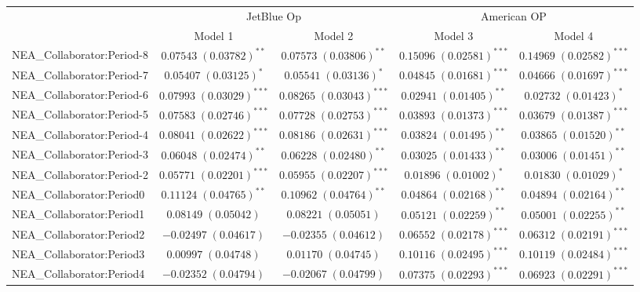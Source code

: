
\begin{tabular}{l c c c c}
\hline
 & \multicolumn{2}{c}{JetBlue Op} & \multicolumn{2}{c}{American OP} \\
\cline{2-3} \cline{4-5}
 & Model 1 & Model 2 & Model 3 & Model 4 \\
\hline
NEA\_Collaborator:Period-8 & $0.07543 \; (0.03782)^{**}$  & $0.07573 \; (0.03806)^{**}$  & $0.15096 \; (0.02581)^{***}$ & $0.14969 \; (0.02582)^{***}$ \\
NEA\_Collaborator:Period-7 & $0.05407 \; (0.03125)^{*}$   & $0.05541 \; (0.03136)^{*}$   & $0.04845 \; (0.01681)^{***}$ & $0.04666 \; (0.01697)^{***}$ \\
NEA\_Collaborator:Period-6 & $0.07993 \; (0.03029)^{***}$ & $0.08265 \; (0.03043)^{***}$ & $0.02941 \; (0.01405)^{**}$  & $0.02732 \; (0.01423)^{*}$   \\
NEA\_Collaborator:Period-5 & $0.07583 \; (0.02746)^{***}$ & $0.07728 \; (0.02753)^{***}$ & $0.03893 \; (0.01373)^{***}$ & $0.03679 \; (0.01387)^{***}$ \\
NEA\_Collaborator:Period-4 & $0.08041 \; (0.02622)^{***}$ & $0.08186 \; (0.02631)^{***}$ & $0.03824 \; (0.01495)^{**}$  & $0.03865 \; (0.01520)^{**}$  \\
NEA\_Collaborator:Period-3 & $0.06048 \; (0.02474)^{**}$  & $0.06228 \; (0.02480)^{**}$  & $0.03025 \; (0.01433)^{**}$  & $0.03006 \; (0.01451)^{**}$  \\
NEA\_Collaborator:Period-2 & $0.05771 \; (0.02201)^{***}$ & $0.05955 \; (0.02207)^{***}$ & $0.01896 \; (0.01002)^{*}$   & $0.01830 \; (0.01029)^{*}$   \\
NEA\_Collaborator:Period0  & $0.11124 \; (0.04765)^{**}$  & $0.10962 \; (0.04764)^{**}$  & $0.04864 \; (0.02168)^{**}$  & $0.04894 \; (0.02164)^{**}$  \\
NEA\_Collaborator:Period1  & $0.08149 \; (0.05042)$       & $0.08221 \; (0.05051)$       & $0.05121 \; (0.02259)^{**}$  & $0.05001 \; (0.02255)^{**}$  \\
NEA\_Collaborator:Period2  & $-0.02497 \; (0.04617)$      & $-0.02355 \; (0.04612)$      & $0.06552 \; (0.02178)^{***}$ & $0.06312 \; (0.02191)^{***}$ \\
NEA\_Collaborator:Period3  & $0.00997 \; (0.04748)$       & $0.01170 \; (0.04745)$       & $0.10116 \; (0.02495)^{***}$ & $0.10119 \; (0.02484)^{***}$ \\
NEA\_Collaborator:Period4  & $-0.02352 \; (0.04794)$      & $-0.02067 \; (0.04799)$      & $0.07375 \; (0.02293)^{***}$ & $0.06923 \; (0.02291)^{***}$ \\

\end{tabular}
